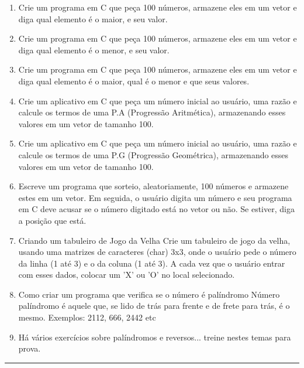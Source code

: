\documentclass[12pt,a4paper]{article}
\begin{document}
\begin{enumerate}

\item Crie um programa em C que peça 100 números, armazene eles em um vetor e diga qual elemento é o maior, e seu valor.

\item  Crie um programa em C que peça 100 números, armazene eles em um vetor e diga qual elemento é o menor, e seu valor.

\item  Crie um programa em C que peça 100 números, armazene eles em um vetor e diga qual elemento é o maior, qual é o menor e que seus valores.


\item  Crie um aplicativo em C que peça um número inicial ao usuário, uma razão e calcule os termos de uma P.A (Progressão Aritmética), armazenando esses valores em um vetor de tamanho 100.

\item  Crie um aplicativo em C que peça um número inicial ao usuário, uma razão e calcule os termos de uma P.G (Progressão Geométrica), armazenando esses valores em um vetor de tamanho 100.

\item  Escreve um programa que sorteio, aleatoriamente, 100 números e armazene estes em um vetor.
Em seguida, o usuário digita um número e seu programa em C deve acusar se o número digitado está no vetor ou não. Se estiver, diga a posição que está.

\item  Criando um tabuleiro de Jogo da Velha
Crie um tabuleiro de jogo da velha, usando uma matrizes de caracteres (char) 3x3, onde o usuário pede o número da linha (1 até 3) e o da coluna (1 até 3). A cada vez que o usuário entrar com esses dados, colocar um 'X' ou 'O' no local selecionado.


\item Como criar um programa que verifica se o número é palíndromo
Número palíndromo é aquele que, se lido de trás para frente e de frete para trás, é o mesmo.
Exemplos: 2112, 666, 2442 etc


\item Há vários exercícios sobre palíndromos e reversos... treine nestes temas para prova.
 
\end{enumerate}



\begin{center}
\rule{15cm}{0.1cm}
\end{center}
\end{document}
